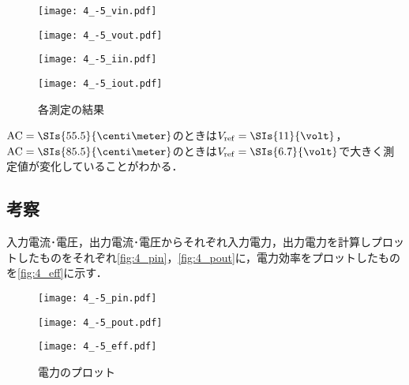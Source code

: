 \documentclass[1_power_supply.tex]{subfiles}
\begin{document}
    \begin{figure}[htbp]
      \centering
      \begin{minipage}{0.45\columnwidth}
        \centering
        \texttt{[image: 4\_-5\_vin.pdf]}
        \label{fig:4_vin}
      \end{minipage}
      \begin{minipage}{0.45\columnwidth}
        \centering
        \texttt{[image: 4\_-5\_vout.pdf]}
        \label{fig:4_vout}
      \end{minipage}
      \hspace{5mm}
      \begin{minipage}{0.45\columnwidth}
        \centering
        \texttt{[image: 4\_-5\_iin.pdf]}
        \label{fig:4_iin}
      \end{minipage}
      \begin{minipage}{0.45\columnwidth}
        \centering
        \texttt{[image: 4\_-5\_iout.pdf]}
        \label{fig:4_iout}
      \end{minipage}
      \caption{各測定の結果}
      \label{figs:4_result}
    \end{figure}
    $\mathrm{AC}=\SIs{55.5}{\centi\meter}$のときは$V_\mathrm{ref}=\SIs{11}{\volt}$，$\mathrm{AC}=\SIs{85.5}{\centi\meter}$のときは$V_\mathrm{ref}=\SIs{6.7}{\volt}$で大きく測定値が変化していることがわかる．

  \subsection{考察}

    入力電流･電圧，出力電流･電圧からそれぞれ入力電力，出力電力を計算しプロットしたものをそれぞれ\ref{fig:4_pin}，\ref{fig:4_pout}に，電力効率をプロットしたものを\ref{fig:4_eff}に示す．


    \begin{figure}[htbp]
      \centering
      \begin{minipage}{0.45\columnwidth}
        \centering
        \texttt{[image: 4\_-5\_pin.pdf]}
        \label{fig:4_pin}
      \end{minipage}
      \begin{minipage}{0.45\columnwidth}
        \centering
        \texttt{[image: 4\_-5\_pout.pdf]}
        \label{fig:4_pout}
      \end{minipage}
      \hspace{5mm}
      \begin{minipage}{\columnwidth}
        \centering
        \texttt{[image: 4\_-5\_eff.pdf]}
        \label{fig:4_eff}
      \end{minipage}
      \caption{電力のプロット}
      \label{figs:4_think}
    \end{figure}
\end{document}
